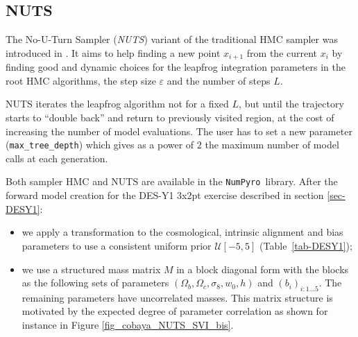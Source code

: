 \documentclass[twocolumn,twocolappendix,nofootinbib,iop]{openjournal}
\newcommand{\numpyro}{\texttt{NumPyro}}
\begin{document}
\subsection{NUTS}
\label{sec-NUTS}
%

The No-U-Turn Sampler (\textit{NUTS})  variant of the traditional HMC sampler was introduced in \citet{10.5555/2627435.2638586}. It aims to help finding a new point  $x_{i+1}$ from  the current $x_i$ by finding good and dynamic choices for the leapfrog integration parameters in the root HMC algorithms, the step size $\varepsilon$ and the number of steps $L$.

NUTS iterates the leapfrog algorithm not for a fixed $L$, but until the trajectory starts to ``double back'' and return to previously visited region, at the cost of increasing the number of model evaluations. The user has to set a new  parameter  (\texttt{max\_tree\_depth}) which gives as a power of $2$ the maximum number of model calls at each generation.

Both sampler HMC and NUTS are available in the \numpyro\ library. After the forward model creation for the DES-Y1 3x2pt exercise described in section \ref{sec-DESY1}: \begin{itemize}
    \item we apply a transformation to the cosmological, intrinsic alignment and bias parameters to use a consistent uniform prior $\mathcal{U}[-5,5]$ (Table~\ref{tab-DESY1});
    \item
    we use a structured mass matrix $M$ in a block diagonal form with the blocks as the following sets of parameters $(\Omega_b,\Omega_c,\sigma_8,w_0,h)$ and $(b_i)_{i:1\dots5}$. The remaining parameters have uncorrelated masses. This matrix structure is motivated by the expected degree of parameter correlation as shown for instance in Figure \ref{fig_cobaya_NUTS_SVI_bis}.
\end{itemize}

\end{document}
